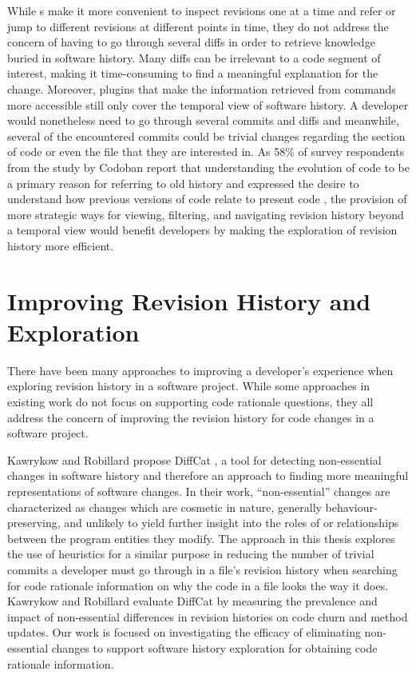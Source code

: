 While s make it more convenient to inspect revisions one at a time and refer 
or jump to different revisions at different points in time, they do not address the concern 
of having to go through several diffs
in order to retrieve knowledge buried in software history. 
Many diffs can be irrelevant to a code segment of interest, 
making it time-consuming to find a meaningful explanation for the change.
Moreover, plugins that make the information retrieved from  commands more 
accessible still only cover the temporal view of software history.
A developer would nonetheless need to go through several commits and diffs and meanwhile, 
several of the encountered commits could be trivial changes regarding the section of code 
or even the file that they are interested in.
As 58\% of survey respondents from the study by Codoban \etal report
that understanding the evolution of code to be a primary reason for
referring to old history and expressed the desire to
understand how previous versions of code relate to present code \cite{codoban_software_2015},
the provision of more strategic ways for viewing, filtering, and 
navigating revision history beyond a temporal view would benefit developers by 
making the exploration of revision history more efficient.


\section{Improving Revision History and Exploration}

There have been many approaches to improving a developer's experience when exploring revision history in a software project. 
While some approaches in existing work do not focus on supporting code rationale questions, 
they all address the concern of improving the revision history for code changes in a software project.

Kawrykow and Robillard propose DiffCat \cite{kawrykow_non-essential_2011}, 
a tool for detecting non-essential changes in software history and therefore an approach to finding 
more meaningful representations of software changes.
In their work, ``non-essential'' changes are characterized as changes which are cosmetic in nature, 
generally behaviour-preserving, and unlikely to yield further insight into the roles of or 
relationships between the program entities they modify. 
The approach in this thesis explores the use of heuristics for a similar purpose in reducing 
the number of trivial commits a developer must go through in a file's revision history when searching 
for code rationale information on why the code in a file looks the way it does.
Kawrykow and Robillard evaluate DiffCat by measuring the prevalence and
impact of non-essential differences in revision histories on code churn and method updates.
Our work is focused on investigating the efficacy of eliminating non-essential changes
to support software history exploration for obtaining code rationale information.

